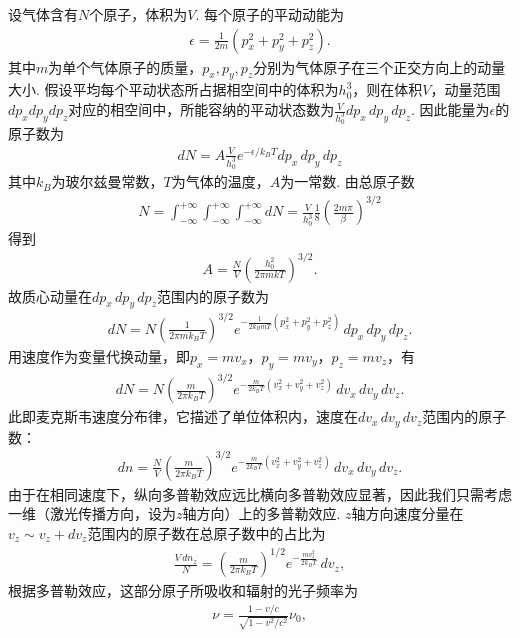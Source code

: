 \documentclass[a4paper, 10pt]{article}
\begin{document}
\begin{multicols*}{2}
设气体含有$N$个原子，体积为$V$. 每个原子的平动动能为
\begin{align}
    \epsilon=\frac{1}{2m}(p_x^2+p_y^2+p_z^2).
\end{align}
其中$m$为单个气体原子的质量，$p_x,p_y,p_z$分别为气体原子在三个正交方向上的动量大小.
假设平均每个平动状态所占据相空间中的体积为$h_0^3$，则在体积$V$，动量范围$dp_xdp_ydp_z$对应的相空间中，所能容纳的平动状态数为$\frac{V}{h_0^3}dp_x\,dp_y\,dp_z$.
因此能量为$\epsilon$的原子数为
\begin{align}
    dN=A\frac{V}{h_0^3}e^{-\epsilon/k_BT}dp_x\,dp_y\,dp_z
\end{align}
其中$k_B$为玻尔兹曼常数，$T$为气体的温度，$A$为一常数.
由总原子数
\begin{align}
    N=\int_{-\infty}^{+\infty}\int_{-\infty}^{+\infty}\int_{-\infty}^{+\infty}dN=\frac{V}{h_0^3}\frac{1}{8}\left(\frac{2m\pi}{\beta}\right)^{3/2}
\end{align}
得到
\begin{align}
    A=\frac{N}{V}\left(\frac{h_0^2}{2\pi mkT}\right)^{3/2}.
\end{align}
故质心动量在$dp_x\,dp_y\,dp_z$范围内的原子数为
\begin{align}
    dN=N\left(\frac{1}{2\pi mk_BT}\right)^{3/2}e^{-\frac{1}{2k_BmT}\left(p_x^2+p_y^2+p_z^2\right)}\,dp_x\,dp_y\,dp_z.
\end{align}
用速度作为变量代换动量，即$p_x=mv_x$，$p_y=mv_y$，$p_z=mv_z$，有
\begin{align}
    dN=N\left(\frac{m}{2\pi k_BT}\right)^{3/2}e^{-\frac{m}{2k_BT}\left(v_x^2+v_y^2+v_z^2\right)}\,dv_x\,dv_y\,dv_z.
\end{align}
此即麦克斯韦速度分布律，它描述了单位体积内，速度在$dv_x\,dv_y\,dv_z$范围内的原子数：
\begin{align}
    dn=\frac{N}{V}\left(\frac{m}{2\pi k_BT}\right)^{3/2}e^{-\frac{m}{2k_BT}\left(v_x^2+v_y^2+v_z^2\right)}\,dv_x\,dv_y\,dv_z.
\end{align}
由于在相同速度下，纵向多普勒效应远比横向多普勒效应显著，因此我们只需考虑一维（激光传播方向，设为$z$轴方向）上的多普勒效应. $z$轴方向速度分量在$v_z\sim v_z+dv_z$范围内的原子数在总原子数中的占比为
\begin{align}
    \frac{V\,dn_z}{N}=\left(\frac{m}{2\pi k_BT}\right)^{1/2}e^{-\frac{mv_z^2}{2k_BT}}\,dv_z,
\end{align}
根据多普勒效应，这部分原子所吸收和辐射的光子频率为
\begin{align}
    \nu=\frac{1-v/c}{\sqrt{1-v^2/c^2}}\nu_0,
\end{align}

\end{multicols*}
\end{document}
